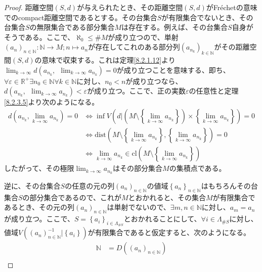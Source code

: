 \documentclass[dvipdfmx]{jsarticle}
\begin{document}
\begin{proof}
距離空間$(S,d)$が与えられたとき、その距離空間$(S,d)$がFréchetの意味でのcompact距離空間であるとする。その台集合$S$が有限集合でないとき、その台集合$S$の無限集合である部分集合$M$は存在する。例えば、その台集合$S$自身がそうである。ここで、$\aleph_{0} \leq {\#}M$が成り立つので、単射$\left( a_{n} \right)_{n \in \mathbb{N}}:\mathbb{N} \rightarrow M;n \mapsto a_{n}$が存在してこれのある部分列$\left( a_{n_{k}} \right)_{k \in \mathbb{N}}$がその距離空間$(S,d)$の意味で収束する。これは定理\ref{8.2.1.12}より$\lim_{k \rightarrow \infty}{d\left( a_{n_{k}},\ \ \lim_{k \rightarrow \infty}a_{n_{k}} \right)} = 0$が成り立つことを意味する、即ち、$\forall\varepsilon \in \mathbb{R}^{+}\exists n_{0} \in \mathbb{N}\forall k \in \mathbb{N}$に対し、$n_{0} < n$が成り立つなら、$d\left( a_{n_{k}},\ \ \lim_{k \rightarrow \infty}a_{n_{k}} \right) < \varepsilon$が成り立つ。ここで、正の実数$\varepsilon$の任意性と定理\ref{8.2.3.5}より次のようになる。
\begin{align*}
d\left( a_{n_{k}},\lim_{k \rightarrow \infty}a_{n_{k}} \right) = 0 &\Leftrightarrow \inf{V\left( d|\left( M \setminus \left\{ \lim_{k \rightarrow \infty}a_{n_{k}} \right\} \right) \times \left\{ \lim_{k \rightarrow \infty}a_{n_{k}} \right\} \right)} = 0\\
&\Leftrightarrow \mathrm{dist}\left( M \setminus \left\{ \lim_{k \rightarrow \infty}a_{n_{k}} \right\},\left\{ \lim_{k \rightarrow \infty}a_{n_{k}} \right\} \right) = 0\\
&\Leftrightarrow \lim_{k \rightarrow \infty}a_{n_{k}} \in {\mathrm{cl}}\left( M \setminus \left\{ \lim_{k \rightarrow \infty}a_{n_{k}} \right\} \right)
\end{align*}
したがって、その極限$\lim_{k \rightarrow \infty}a_{n_{k}}$はその部分集合$M$の集積点である。\par
逆に、その台集合$S$の任意の元の列$\left( a_{n} \right)_{n \in \mathbb{N}}$の値域$\left\{ a_{n} \right\}_{n \in \mathbb{N}}$はもちろんその台集合$S$の部分集合であるので、これが$M$とおかれると、その集合$M$が有限集合であるとき、その元の列$\left( a_{n} \right)_{n \in \mathbb{N}}$は単射でないので、$\exists m,n \in \mathbb{N}$に対し、$a_{m} = a_{n}$が成り立つ。ここで、$S = \left\{ a_{i} \right\}_{i \in \varLambda_{{\#}S}}$とおかれることにして、$\forall i \in \varLambda_{{\#}S}$に対し、値域$V\left( \left( a_{n} \right)_{n \in \mathbb{N}}^{- 1}|\left\{ a_{i} \right\} \right)$が有限集合であると仮定すると、次のようになる。
\begin{align*}
\mathbb{N} &= D\left( \left( a_{n} \right)_{n \in \mathbb{N}} \right)\\

\end{align*}
\end{proof}
\end{document}
